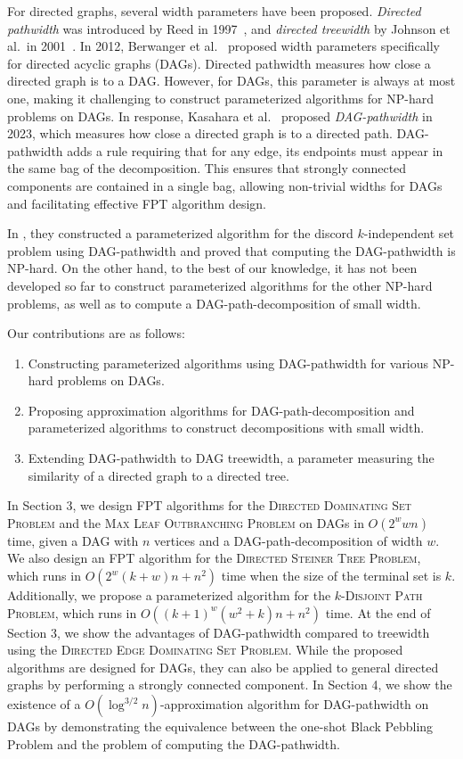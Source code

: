 \documentclass[runningheads]{llncs}
\theoremstyle{plain}
\theoremstyle{definition}
\begin{document}
For directed graphs, several width parameters have been proposed. \emph{Directed pathwidth} was introduced by Reed in 1997~\cite{art9}, and \emph{directed treewidth} by Johnson et al.~in 2001~\cite{art10}. In 2012, Berwanger et al.~\cite{art11} proposed width parameters specifically for directed acyclic graphs (DAGs). Directed pathwidth measures how close a directed graph is to a DAG. However, for DAGs, this parameter is always at most one, making it challenging to construct parameterized algorithms for NP-hard problems on DAGs. In response, Kasahara et al.~\cite{art12} proposed \emph{DAG-pathwidth} in 2023, which measures how close a directed graph is to a directed path. DAG-pathwidth adds a rule requiring that for any edge, its endpoints must appear in the same bag of the decomposition. This ensures that strongly connected components are contained in a single bag, allowing non-trivial widths for DAGs and facilitating effective FPT algorithm design.

In \cite{art12}, they constructed a parameterized algorithm for the discord $k$-independent set problem using DAG-pathwidth and proved that computing the DAG-pathwidth is NP-hard. On the other hand, to the best of our knowledge, it has not been developed so far to construct parameterized algorithms for the other NP-hard problems, as well as to compute a DAG-path-decomposition of small width.

Our contributions are as follows:  
\begin{enumerate}
    \item Constructing parameterized algorithms using DAG-pathwidth for various NP-hard problems on DAGs.  
    \item Proposing approximation algorithms for DAG-path-decomposition and parameterized algorithms to construct decompositions with small width.  
    \item Extending DAG-pathwidth to DAG treewidth, a parameter measuring the similarity of a directed graph to a directed tree.  
\end{enumerate}

In Section 3, we design FPT algorithms for the \textsc{Directed Dominating Set Problem} and the \textsc{Max Leaf Outbranching Problem} on DAGs in $O(2^w wn)$ time, given a DAG with $n$ vertices and a DAG-path-decomposition of width $w$. We also design an FPT algorithm for the \textsc{Directed Steiner Tree Problem}, which runs in $O(2^w(k + w)n + n^2)$ time when the size of the terminal set is $k$. Additionally, we propose a parameterized algorithm for the \textsc{$k$-Disjoint Path Problem}, which runs in $O((k + 1)^w(w^2 + k)n + n^2)$ time. At the end of Section 3, we show the advantages of DAG-pathwidth compared to treewidth using the \textsc{Directed Edge Dominating Set Problem}. While the proposed algorithms are designed for DAGs, they can also be applied to general directed graphs by performing a strongly connected component. In Section 4, we show the existence of a $O(\log^{3/2} n)$-approximation algorithm for DAG-pathwidth on DAGs by demonstrating the equivalence between the one-shot Black Pebbling Problem and the problem of computing the DAG-pathwidth. 
\end{document}

